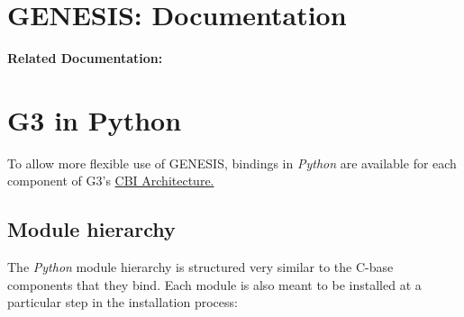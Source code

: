 \documentclass[12pt]{article}
\begin{document}
\section*{GENESIS: Documentation}

{\bf Related Documentation:}

\section*{G3 in Python}

	To allow more flexible use of GENESIS, bindings in {\it Python} are available for each component of G3's \href{../cbi-architecture/cbi-architecture.tex}{CBI Architecture.} 

\subsection*{Module hierarchy}

	The {\it Python} module hierarchy is structured very similar to the C-base components that they bind. Each module is also meant to be installed at a particular step in the installation process:
	
\end{document}
